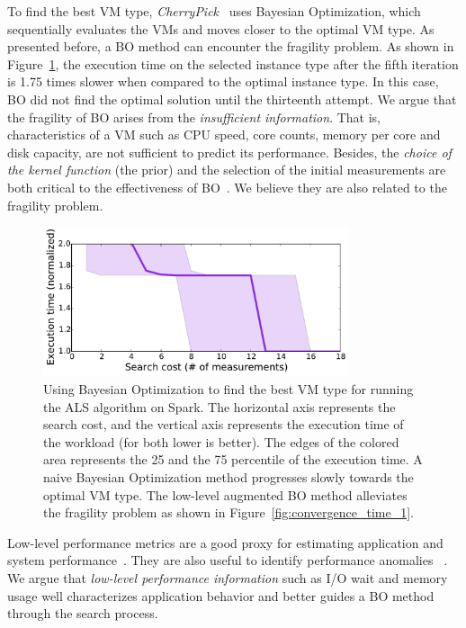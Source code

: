To find the best VM type, \emph{CherryPick}~\cite{Alipourfard2017} uses Bayesian Optimization, which sequentially evaluates the VMs and
moves closer to the optimal VM type.
As presented before, a BO method can encounter the fragility problem.
As shown in Figure~\ref{fig:cherrypick_issue2}, 
the execution time on the selected instance type after the fifth iteration is 1.75 times slower when
compared to the optimal instance type.
In this case, BO did not find the optimal solution until the thirteenth attempt.
We argue that the fragility of BO arises from the \textit{insufficient information}.
That is, characteristics of a VM such as CPU speed, core counts, memory per core and disk capacity, are not sufficient to predict its performance.
Besides, the \textit{choice of the kernel function} (the prior) and
the selection of the initial measurements are both critical to the effectiveness of BO~\cite{Brochu2010, Snoek2012, Dewancker2015, shahriari2016taking}.
We believe they are also related to the fragility problem.


\begin{figure}[!htbp]
    \centering
    \includegraphics[width=0.8\textwidth]{figures/cherrypick_issue_spark_als_large_new.pdf}
    \caption{Using Bayesian Optimization to find the best VM type for running the ALS algorithm on Spark.
    The horizontal axis represents the search cost, and the vertical axis represents the execution time of the workload (for both lower is better).
    The edges of the colored area represents the 25 and the 75 percentile of the execution time.
    A naive Bayesian Optimization method progresses slowly towards the optimal VM type.
    The low-level augmented BO method alleviates the fragility problem as shown in Figure~\ref{fig:convergence_time_1}.
    }
    \label{fig:cherrypick_issue2}
\end{figure}


Low-level performance metrics are a good proxy for estimating
application and system performance~\cite{Hsu2016, Yadwadkar2017}.
They are also useful to identify performance anomalies
~\cite{Bodik2010, Novakovic2013}.
We argue that \textit{low-level performance
  information} such as I/O wait and memory usage well characterizes
application behavior and better
guides a BO method through the search process.


